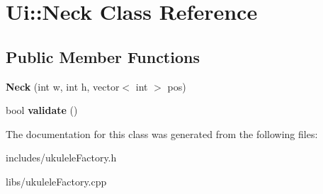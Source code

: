\hypertarget{class_ui_1_1_neck}{}\section{Ui\+:\+:Neck Class Reference}
\label{class_ui_1_1_neck}
\subsection*{Public Member Functions}
\begin{DoxyCompactItemize}
\item 
\hypertarget{class_ui_1_1_neck_a5cc4c0c5f4fc6bf8c7416b3c5104767a}{}\label{class_ui_1_1_neck_a5cc4c0c5f4fc6bf8c7416b3c5104767a} 
{\bfseries Neck} (int w, int h, vector$<$ int $>$ pos)
\item 
\hypertarget{class_ui_1_1_neck_aec50f2ecbe39d970630412919428f929}{}\label{class_ui_1_1_neck_aec50f2ecbe39d970630412919428f929} 
bool {\bfseries validate} ()
\end{DoxyCompactItemize}


The documentation for this class was generated from the following files\+:\begin{DoxyCompactItemize}
\item 
includes/ukulele\+Factory.\+h\item 
libs/ukulele\+Factory.\+cpp\end{DoxyCompactItemize}
